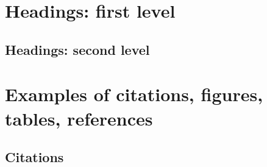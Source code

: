\documentclass{article}
\begin{document}
\subsection{}

\section{Headings: first level}
\label{sec:headings}


\subsection{Headings: second level}





\section{Examples of citations, figures, tables, references}

\subsection{Citations}

\end{document}
